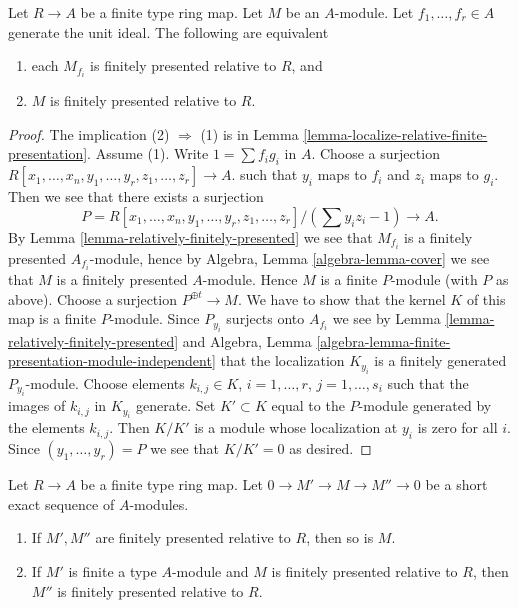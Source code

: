 \begin{lemma}
\label{lemma-glue-relative-finite-presentation}
Let $R \to A$ be a finite type ring map. Let $M$ be an $A$-module.
Let $f_1, \ldots, f_r \in A$ generate the unit ideal.
The following are equivalent
\begin{enumerate}
\item each $M_{f_i}$ is finitely presented relative to $R$, and
\item $M$ is finitely presented relative to $R$.
\end{enumerate}
\end{lemma}

\begin{proof}
The implication (2) $\Rightarrow$ (1) is in
Lemma \ref{lemma-localize-relative-finite-presentation}.
Assume (1). Write $1 = \sum f_ig_i$ in $A$.
Choose a surjection
$R[x_1, \ldots, x_n, y_1, \ldots, y_r, z_1, \ldots, z_r] \to A$.
such that $y_i$ maps to $f_i$ and $z_i$ maps to $g_i$. Then we
see that there exists a surjection
$$
P = R[x_1, \ldots, x_n, y_1, \ldots, y_r, z_1, \ldots, z_r]/(\sum y_iz_i - 1)
\longrightarrow
A.
$$
By
Lemma \ref{lemma-relatively-finitely-presented}
we see that $M_{f_i}$ is a finitely presented $A_{f_i}$-module, hence by
Algebra, Lemma \ref{algebra-lemma-cover}
we see that $M$ is a finitely presented $A$-module.
Hence $M$ is a finite $P$-module (with $P$ as above).
Choose a surjection $P^{\oplus t} \to M$.
We have to show that the kernel $K$ of this map is a finite
$P$-module. Since $P_{y_i}$ surjects onto
$A_{f_i}$ we see by
Lemma \ref{lemma-relatively-finitely-presented}
and
Algebra, Lemma \ref{algebra-lemma-finite-presentation-module-independent}
that the localization $K_{y_i}$ is a finitely generated
$P_{y_i}$-module. Choose elements
$k_{i, j} \in K$, $i = 1, \ldots, r$, $j = 1, \ldots, s_i$ such
that the images of $k_{i, j}$ in $K_{y_i}$ generate.
Set $K' \subset K$ equal to the $P$-module
generated by the elements $k_{i, j}$. Then $K/K'$ is a module
whose localization at $y_i$ is zero for all $i$. Since $(y_1, \ldots, y_r) = P$
we see that $K/K' = 0$ as desired.
\end{proof}

\begin{lemma}
\label{lemma-ses-relatively-finite-presentation}
Let $R \to A$ be a finite type ring map. Let $0 \to M' \to M \to M'' \to 0$
be a short exact sequence of $A$-modules.
\begin{enumerate}
\item If $M', M''$ are finitely presented relative to $R$, then so is $M$.
\item If $M'$ is finite a type $A$-module and $M$ is finitely presented
relative to $R$, then $M''$ is finitely presented relative to $R$.
\end{enumerate}
\end{lemma}

